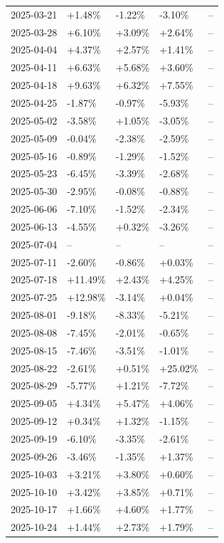 \documentclass[11pt,a4paper]{article}
\begin{document}
\begin{longtable}{lllll}
2025-03-21 & +1.48\% & -1.22\% & -3.10\% & -- \\
2025-03-28 & +6.10\% & +3.09\% & +2.64\% & -- \\
2025-04-04 & +4.37\% & +2.57\% & +1.41\% & -- \\
2025-04-11 & +6.63\% & +5.68\% & +3.60\% & -- \\
2025-04-18 & +9.63\% & +6.32\% & +7.55\% & -- \\
2025-04-25 & -1.87\% & -0.97\% & -5.93\% & -- \\
2025-05-02 & -3.58\% & +1.05\% & -3.05\% & -- \\
2025-05-09 & -0.04\% & -2.38\% & -2.59\% & -- \\
2025-05-16 & -0.89\% & -1.29\% & -1.52\% & -- \\
2025-05-23 & -6.45\% & -3.39\% & -2.68\% & -- \\
2025-05-30 & -2.95\% & -0.08\% & -0.88\% & -- \\
2025-06-06 & -7.10\% & -1.52\% & -2.34\% & -- \\
2025-06-13 & -4.55\% & +0.32\% & -3.26\% & -- \\
2025-07-04 & -- & -- & -- & -- \\
2025-07-11 & -2.60\% & -0.86\% & +0.03\% & -- \\
2025-07-18 & +11.49\% & +2.43\% & +4.25\% & -- \\
2025-07-25 & +12.98\% & -3.14\% & +0.04\% & -- \\
2025-08-01 & -9.18\% & -8.33\% & -5.21\% & -- \\
2025-08-08 & -7.45\% & -2.01\% & -0.65\% & -- \\
2025-08-15 & -7.46\% & -3.51\% & -1.01\% & -- \\
2025-08-22 & -2.61\% & +0.51\% & +25.02\% & -- \\
2025-08-29 & -5.77\% & +1.21\% & -7.72\% & -- \\
2025-09-05 & +4.34\% & +5.47\% & +4.06\% & -- \\
2025-09-12 & +0.34\% & +1.32\% & -1.15\% & -- \\
2025-09-19 & -6.10\% & -3.35\% & -2.61\% & -- \\
2025-09-26 & -3.46\% & -1.35\% & +1.37\% & -- \\
2025-10-03 & +3.21\% & +3.80\% & +0.60\% & -- \\
2025-10-10 & +3.42\% & +3.85\% & +0.71\% & -- \\
2025-10-17 & +1.66\% & +4.60\% & +1.77\% & -- \\
2025-10-24 & +1.44\% & +2.73\% & +1.79\% & -- \\

\end{longtable}
\end{document}
